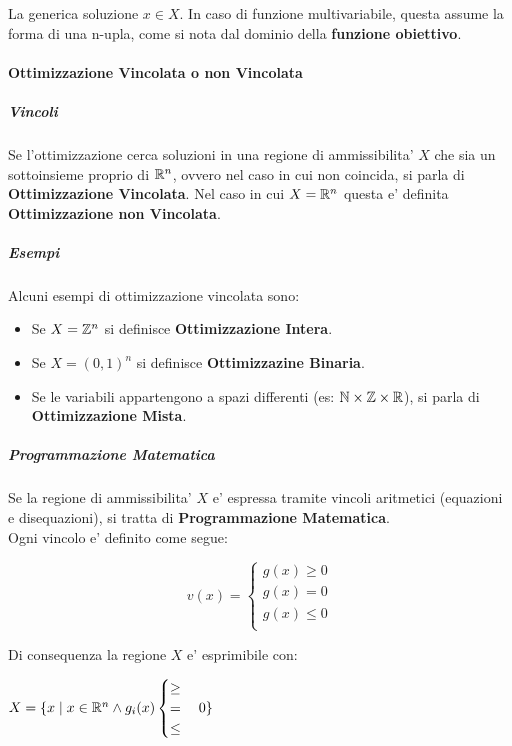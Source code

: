 La generica soluzione $x \in X$. In caso di funzione multivariabile, questa assume la forma di una n-upla, come si nota dal dominio della \textbf{funzione obiettivo}.

\paragraph{Ottimizzazione Vincolata o non Vincolata}

\subparagraph{Vincoli}

Se l'ottimizzazione cerca soluzioni in una regione di ammissibilita' $X$ che sia un sottoinsieme proprio di $\mathbb{R}^n$, ovvero nel caso in cui non coincida, si parla di \textbf{Ottimizzazione Vincolata}.
Nel caso in cui $X = \mathbb{R}^n$ questa e' definita \textbf{Ottimizzazione non Vincolata}.

\subparagraph{Esempi}
Alcuni esempi di ottimizzazione vincolata sono:

\begin{itemize}
    \item Se $X = \mathbb{Z}^n$ si definisce \textbf{Ottimizzazione Intera}.
    \item Se $X = (0,1)^n$ si definisce \textbf{Ottimizzazine Binaria}.
    \item Se le variabili appartengono a spazi differenti (es: $\mathbb{N} \times \mathbb{Z} \times \mathbb{R}$), si parla di \textbf{Ottimizzazione Mista}.
\end{itemize}

\subparagraph{Programmazione Matematica}

Se la regione di ammissibilita' $X$ e' espressa tramite vincoli aritmetici (equazioni e disequazioni), si tratta di \textbf{Programmazione Matematica}. \\

Ogni vincolo e' definito come segue:

\[
    v(x) =
    \begin{cases}
        \text{$g(x) \geq 0$} \\
        \text{$g(x) = 0$} \\
        \text{$g(x) \leq 0$} \\
    \end{cases}
\]

Di consequenza la regione $X$ e' esprimibile con:

$X = \{ x \mid x \in \mathbb{R}^n \land g_i(x) \begin{cases} \geq \\ = \\ \leq \end{cases} 0\}$

